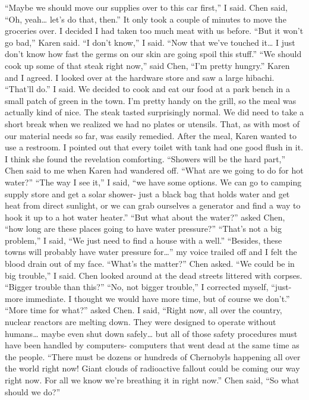 \documentclass[a4paper]{article}
\begin{document}
“Maybe we should move our supplies over to this car first,” I said.
Chen said, “Oh, yeah… let’s do that, then.”
It only took a couple of minutes to move the groceries over. I decided I had taken too much meat with us before.
“But it won’t go bad,” Karen said.
“I don’t know,” I said. “Now that we’ve touched it… I just don’t know how fast the germs on our skin are going spoil this stuff.”
“We should cook up some of that steak right now,” said Chen, “I’m pretty hungry.”
Karen and I agreed. I looked over at the hardware store and saw a large hibachi. “That’ll do.” I said.
We decided to cook and eat our food at a park bench in a small patch of green in the town. I’m pretty handy on the grill, so the meal was actually kind of nice. The steak tasted surprisingly normal. We did need to take a short break when we realized we had no plates or utensils. That, as with most of our material needs so far, was easily remedied.
After the meal, Karen wanted to use a restroom. I pointed out that every toilet with tank had one good flush in it. I think she found the revelation comforting.
“Showers will be the hard part,” Chen said to me when Karen had wandered off. “What are we going to do for hot water?”
“The way I see it,” I said, “we have some options. We can go to camping supply store and get a solar shower- just a black bag that holds water and get heat from direct sunlight, or we can grab ourselves a generator and find a way to hook it up to a hot water heater.”
“But what about the water?” asked Chen, “how long are these places going to have water pressure?”
“That’s not a big problem,” I said, “We just need to find a house with a well.”
“Besides, these towns will probably have water pressure for…” my voice trailed off and I felt the blood drain out of my face.
“What’s the matter?” Chen asked.
“We could be in big trouble,” I said.
Chen looked around at the dead streets littered with corpses. “Bigger trouble than this?”
“No, not bigger trouble,” I corrected myself, “just- more immediate. I thought we would have more time, but of course we don’t.”
“More time for what?” asked Chen.
I said, “Right now, all over the country, nuclear reactors are melting down. They were designed to operate without humans… maybe even shut down safely… but all of those safety procedures must have been handled by computers- computers that went dead at the same time as the people.
“There must be dozens or hundreds of Chernobyls happening all over the world right now! Giant clouds of radioactive fallout could be coming our way right now. For all we know we’re breathing it in right now.”
Chen said, “So what should we do?”
\end{document}
